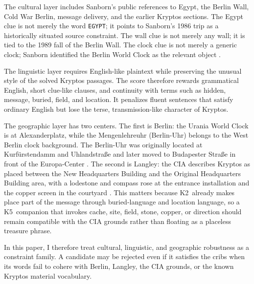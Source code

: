 \documentclass[12pt]{paperFormatting}
\newcommand{\Kfive}{K5}
\newcommand{\Ktwo}{K2}
\begin{document}
\begin{thesisbody}
The cultural layer includes Sanborn's public references to Egypt, the Berlin Wall, Cold War Berlin, message delivery, and the earlier Kryptos sections. The Egypt clue is not merely the word \texttt{EGYPT}; it points to Sanborn's 1986 trip as a historically situated source constraint. The wall clue is not merely any wall; it is tied to the 1989 fall of the Berlin Wall. The clock clue is not merely a generic clock; Sanborn identified the Berlin World Clock as the relevant object \cite{verganoFinalClues2025}.

The linguistic layer requires English-like plaintext while preserving the unusual style of the solved Kryptos passages. The score therefore rewards grammatical English, short clue-like clauses, and continuity with terms such as hidden, message, buried, field, and location. It penalizes fluent sentences that satisfy ordinary English but lose the terse, transmission-like character of Kryptos.

The geographic layer has two centers. The first is Berlin: the Urania World Clock is at Alexanderplatz, while the Mengenlehreuhr (Berlin-Uhr) belongs to the West Berlin clock background. The Berlin-Uhr was originally located at Kurfürstendamm and Uhlandstraße and later moved to Budapester Straße in front of the Europa-Center \cite{berlinWorldClock,berlinUhrOfficial,europaCenterSetTheoryClockArchive}. The second is Langley: the CIA describes Kryptos as placed between the New Headquarters Building and the Original Headquarters Building area, with a lodestone and compass rose at the entrance installation and the copper screen in the courtyard \cite{ciaKryptosSculpture}. This matters because \Ktwo\ already makes place part of the message through buried-language and location language, so a \Kfive\ companion that invokes cache, site, field, stone, copper, or direction should remain compatible with the CIA grounds rather than floating as a placeless treasure phrase.

In this paper, I therefore treat cultural, linguistic, and geographic robustness as a constraint family. A candidate may be rejected even if it satisfies the cribs when its words fail to cohere with Berlin, Langley, the CIA grounds, or the known Kryptos material vocabulary.


\end{thesisbody}
\end{document}

